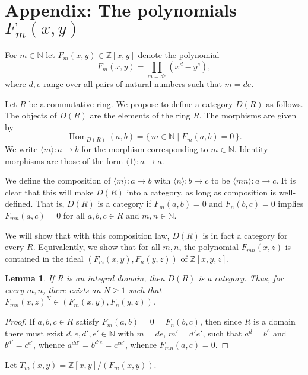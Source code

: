 \documentclass[11pt]{amsart}
\numberwithin{equation}{section}
\theoremstyle{plain}
\newtheorem{lemma}[subsection]{Lemma}
\theoremstyle{remark}
\theoremstyle{plain}
\begin{document}
\section*{Appendix: The polynomials $F_m(x,y)$}

For $m\in {\mathbb{N}}$ let $F_m(x,y)\in {\mathbb{Z}}[x,y]$ denote the
polynomial
\[
F_m(x,y) = \prod_{m=de} (x^d-y^e),
\]
where $d,e$ range over all pairs of natural numbers such that $m=de$.

Let $R$ be a commutative ring.  We propose to define a category $D(R)$
as follows.  
The objects of $D(R)$ are the elements of the ring $R$.
The morphisms are given by
\[
{{\operatorname{Hom}}}_{D(R)}(a,b)={{\{\,{m\in {\mathbb{N}}}\mid{F_m(a,b)=0}\,\}}}.
\]
We write $\langle m\rangle\colon a{\rightarrow} b$ for the morphism corresponding to $m\in
{\mathbb{N}}$.  
Identity morphisms are those of the form $\langle 1\rangle\colon a{\rightarrow} a$.

We define the composition of $\langle m\rangle \colon a{\rightarrow} b$ with
$\langle n\rangle\colon b{\rightarrow}
c$ to be $\langle mn\rangle\colon a{\rightarrow} c$.  It is clear that this will
make $D(R)$ 
into a category, as long as composition is well-defined.  That is,
$D(R)$ is a category if $F_m(a,b)=0$ and $F_n(b,c)=0$ implies
$F_{mn}(a,c)=0$ for all $a,b,c\in R$ and $m,n\in {\mathbb{N}}$.  

We will show that with this composition law, $D(R)$ is in fact a
category for every $R$.  Equivalently, we show that for all $m,n$,
the polynomial $F_{mn}(x,z)$ 
is contained in the ideal $(F_m(x,y),F_n(y,z))$ of ${\mathbb{Z}}[x,y,z]$.

\begin{lemma}
If $R$ is an integral domain, then $D(R)$ is a category.  Thus, for
every $m,n$, there exists an $N\geq 1$ such that $F_{mn}(x,z)^N\in
(F_m(x,y), F_n(y,z))$.
\end{lemma}
\begin{proof}
If $a,b,c\in R$ satisfy $F_m(a,b)=0=F_n(b,c)$, then since $R$ is a
domain there must exist
$d,e,d',e'\in {\mathbb{N}}$ with $m=de$, $m'=d'e'$, such that $a^d=b^e$ and
$b^{d'}=c^{e'}$, whence $a^{dd'}=b^{d'e}=c^{ee'}$, whence
$F_{mn}(a,c)=0$.
\end{proof}

Let $T_m(x,y)={\mathbb{Z}}[x,y]/(F_m(x,y))$.  
\end{document}
